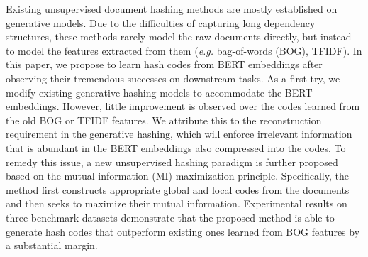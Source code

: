 Existing unsupervised document hashing methods are mostly established on generative models. Due to the difficulties of capturing long dependency structures, these methods rarely model the raw documents directly, but instead to model the features extracted from them ({\it e.g.} bag-of-words (BOG), TFIDF). In this paper, we propose to learn hash codes from BERT embeddings after observing their tremendous successes on downstream tasks. As a first try, we modify existing generative hashing models to accommodate the BERT embeddings. However, little improvement is observed over the codes learned from the old BOG or TFIDF features. We attribute this to the reconstruction requirement in the generative hashing, which will enforce irrelevant information that is abundant in the BERT embeddings also compressed into the codes. To remedy this issue, a new unsupervised hashing paradigm is further proposed based on the mutual information (MI) maximization principle. Specifically, the method first constructs appropriate global and local codes from the documents and then seeks to maximize their mutual information. Experimental results on three benchmark datasets demonstrate that the proposed method is able to generate hash codes that outperform existing ones learned from BOG features by a substantial margin.
